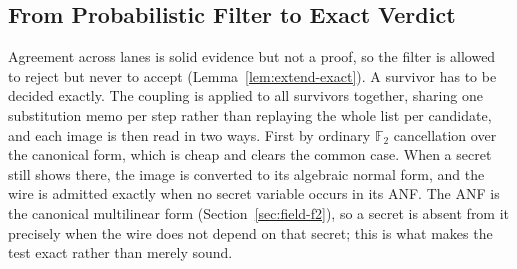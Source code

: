   \subsection{From Probabilistic Filter to Exact Verdict}
  \label{sec:anf-impl}

  Agreement across lanes is solid evidence but not a proof, so the filter is allowed to
  reject but never to accept (Lemma~\ref{lem:extend-exact}). A survivor has to be decided
  exactly. The coupling is applied to all survivors together, sharing one
  substitution memo per step rather than replaying the whole list per candidate,
  and each image is then read in two ways. First by ordinary $\mathbb{F}_2$
  cancellation over the canonical form, which is cheap and clears the common case.
  When a secret still shows there, the image is converted to its algebraic normal
  form, and the wire is admitted exactly when no secret variable occurs in its ANF.
  The ANF is the canonical multilinear form (Section~\ref{sec:field-f2}), so a
  secret is absent from it precisely when the wire does not depend on that secret;
  this is what makes the test exact rather than merely sound.

